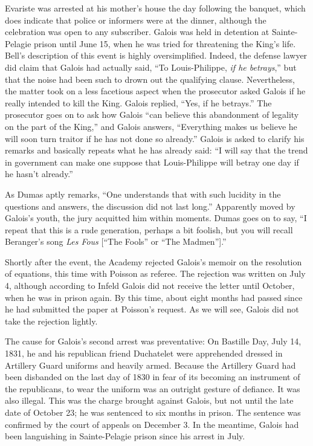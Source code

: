 \documentclass[12pt]{article}
\begin{document}
Evariste was arrested at his mother's house the day following the banquet, which does indicate that police or informers were at the dinner, although the celebration was open to any subscriber. Galois was held in detention at Sainte-Pelagie prison until June 15, when he was tried for threatening the King's life. Bell's description of this event is highly oversimplified. Indeed, the defense lawyer did claim that Galois had actually said, ``To Louis-Philippe, {\it if he betrays},'' but that the noise had been such to drown out the qualifying clause. Nevertheless, the matter took on a less facetious aspect when the prosecutor asked Galois if he really intended to kill the King. Galois replied, ``Yes, if he betrays.'' The prosecutor goes on to ask how Galois ``can believe this abandonment of legality on the part of the King,'' and Galois answers, ``Everything makes us believe he will soon turn traitor if he has not done so already.'' Galois is asked to clarify his remarks and basically repeats what he has already said: ``I will say that the trend in government can make one suppose that Louis-Philippe will betray one day if he hasn't already.''

As Dumas aptly remarks, ``One understands that with such lucidity in the questions and answers, the discussion did not last long.'' Apparently moved by Galois's youth, the jury acquitted him within moments. Dumas goes on to say, ``I repeat that this is a rude generation, perhaps a bit foolish, but you will recall Beranger's song \emph{Les Fous} [``The Fools'' or ``The Madmen''].'' \cite{55}

Shortly after the event, the Academy rejected Galois's memoir on the resolution of equations, this time with Poisson as referee. The rejection was written on July 4, although according to Infeld \cite{56} Galois did not receive the letter until October, when he was in prison again. By this time, about eight months had passed since he had submitted the paper at Poisson's request. As we will see, Galois did not take the rejection lightly.

The cause for Galois's second arrest was preventative: On Bastille Day, July 14, 1831, he and his republican friend Duchatelet were apprehended dressed in Artillery Guard uniforms and heavily armed. Because the Artillery Guard had been disbanded on the last day of 1830 in fear of its becoming an instrument of the republicans, to wear the uniform was an outright gesture of defiance. It was also illegal. This was the charge brought against Galois, but not until the late date of October 23; he was sentenced to six months in prison. The sentence was confirmed by the court of appeals on December 3. In the meantime, Galois had been languishing in Sainte-Pelagie prison since his arrest in July.
\end{document}
